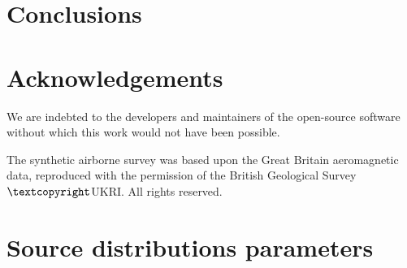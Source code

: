 \documentclass[twocolumn]{article}
\begin{document}

\section{Conclusions}


\section{Acknowledgements}

We are indebted to the developers and maintainers of the open-source software
without which this work would not have been possible.

The synthetic airborne survey was based upon the Great Britain aeromagnetic
data, reproduced with the permission of the British Geological Survey
$\textcopyright$UKRI\@.
All rights reserved.


\appendix

\section{Source distributions parameters}
\end{document}
